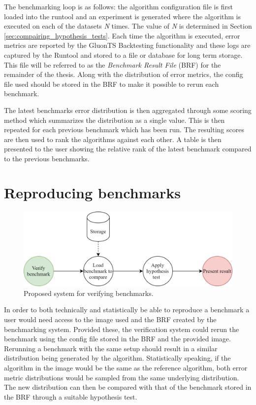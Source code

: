 The benchmarking loop is as follows: the algorithm configuration file is first loaded into the runtool and an experiment is generated where the algorithm is executed on each of the datasets \textit{N} times. The value of \textit{N} is determined in Section \ref{sec:compairing_hypothesis_tests}. Each time the algorithm is executed, error metrics are reported by the GluonTS Backtesting functionality and these logs are captured by the Runtool and stored to a file or database for long term storage. This file will be referred to as the \textit{Benchmark Result File} (BRF) for the remainder of the thesis. Along with the distribution of error metrics, the config file used should be stored in the BRF to make it possible to rerun each benchmark.

The latest benchmarks error distribution is then aggregated through some scoring method which summarizes the distribution as a single value. This is then repeated for each previous benchmark which has been run. The resulting scores are then used to rank the algorithms against each other. A table is then presented to the user showing the relative rank of the latest benchmark compared to the previous benchmarks.

\section{Reproducing benchmarks}
\label{sec:reproduce_benchmarks}
\begin{figure}[h]
  \centering
  \includegraphics[width=\linewidth]{./img/verify_benchmark.png}
  \caption{Proposed system for verifying benchmarks.}
  \label{fig:proposed_validation_system}
\end{figure}

In order to both technically and statistically be able to reproduce a benchmark a user would need access to the image used and the BRF created by the benchmarking system. Provided these, the verification system could rerun the benchmark using the config file stored in the BRF and the provided image. Rerunning a benchmark with the same setup should result in a similar distribution being generated by the algorithm. Statistically speaking, if the algorithm in the image would be the same as the reference algorithm, both error metric distributions would be sampled from the same underlying distribution. The new distribution can then be compared with that of the benchmark stored in the BRF through a suitable hypothesis test.

